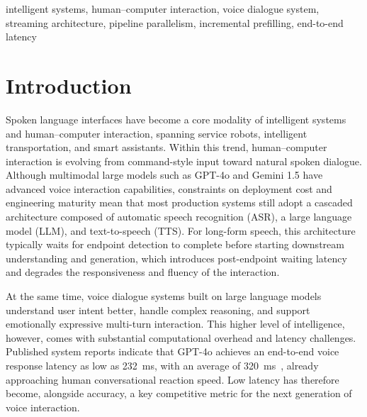 \documentclass[conference]{IEEEtran}
\begin{document}
\begin{IEEEkeywords}
intelligent systems, human--computer interaction, voice dialogue system, streaming architecture, pipeline parallelism, incremental prefilling, end-to-end latency
\end{IEEEkeywords}

\section{Introduction}\label{sec:intro}

Spoken language interfaces have become a core modality of intelligent systems and human--computer interaction, spanning service robots, intelligent transportation, and smart assistants. Within this trend, human--computer interaction is evolving from command-style input toward natural spoken dialogue. Although multimodal large models such as GPT-4o and Gemini 1.5 have advanced voice interaction capabilities, constraints on deployment cost and engineering maturity mean that most production systems still adopt a cascaded architecture composed of automatic speech recognition (ASR), a large language model (LLM), and text-to-speech (TTS). For long-form speech, this architecture typically waits for endpoint detection to complete before starting downstream understanding and generation, which introduces post-endpoint waiting latency and degrades the responsiveness and fluency of the interaction.

At the same time, voice dialogue systems built on large language models understand user intent better, handle complex reasoning, and support emotionally expressive multi-turn interaction. This higher level of intelligence, however, comes with substantial computational overhead and latency challenges. Published system reports indicate that GPT-4o achieves an end-to-end voice response latency as low as 232~ms, with an average of 320~ms~\cite{ref1}, already approaching human conversational reaction speed. Low latency has therefore become, alongside accuracy, a key competitive metric for the next generation of voice interaction.
\end{document}
